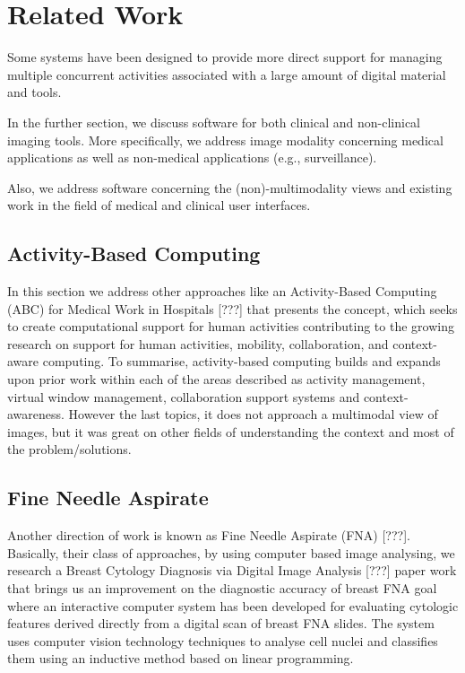 
\chapter{Related Work}
\label{chapter:related_work}

Some systems have been designed to provide more direct support for managing multiple concurrent activities associated with a large amount of digital material and tools.

In the further section, we discuss software for both clinical and non-clinical imaging tools. More specifically, we address image modality concerning medical applications as well as non-medical applications (e.g., surveillance).

Also, we address software concerning the (non)-multimodality views and existing work in the field of medical and clinical user interfaces.

\section{Activity-Based Computing}

In this section we address other approaches like an Activity-Based Computing (ABC) for Medical Work in Hospitals [???] that presents the concept, which seeks to create computational support for human activities contributing to the growing research on support for human activities, mobility, collaboration, and context-aware computing. To summarise, activity-based computing builds and expands upon prior work within each of the areas described as activity management, virtual window management, collaboration support systems and context-awareness. However the last topics, it does not approach a multimodal view of images, but it was great on other fields of understanding the context and most of the problem/solutions.

\section{Fine Needle Aspirate}

Another direction of work is known as Fine Needle Aspirate (FNA) [???]. Basically, their class of approaches, by using computer based image analysing, we research a Breast Cytology Diagnosis via Digital Image Analysis [???] paper work that brings us an improvement on the diagnostic accuracy of breast FNA goal where an interactive computer system has been developed for evaluating cytologic features derived directly from a digital scan of breast FNA slides. The system uses computer vision technology techniques to analyse cell nuclei and classifies them using an inductive method based on linear programming.

